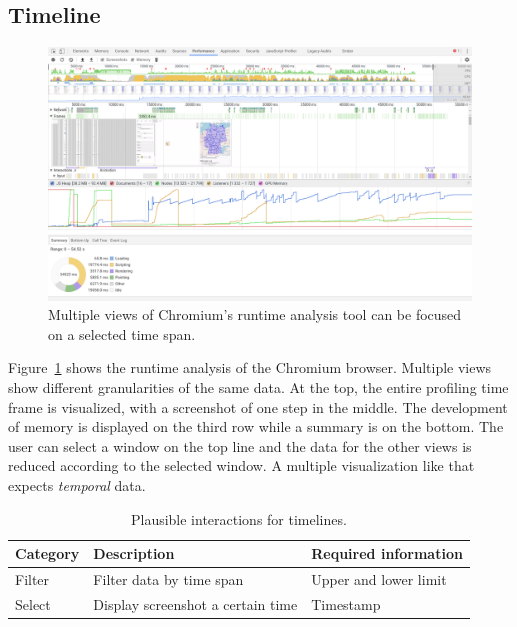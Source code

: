 \subsection{Timeline}

\begin{figure}
  \centering
    \includegraphics[width=\linewidth]{figures/analysis/profiler}
  \caption{Multiple views of Chromium's runtime analysis tool can be focused on a selected time span.}
  \label{fig:analysis:timeline}
\end{figure}
Figure~\ref{fig:analysis:timeline} shows the runtime analysis of the Chromium browser.
Multiple views show different granularities of the same data.
At the top, the entire profiling time frame is visualized, with a screenshot of one step in the middle.
The development of memory is displayed on the third row while a summary is on the bottom.
The user can select a window on the top line and the data for the other views is reduced according to the selected window.
A multiple visualization like that expects \emph{temporal} data.

\begin{table}[H]
  \caption{Plausible interactions for timelines.}%
  \label{fig:analysis:timeline:interactions}
  \begin{tabularx}{\linewidth}{lXX}
    \bf Category & \bf Description & \bf Required information \\
    \hline
    Filter & Filter data by time span & Upper and lower limit \\
    Select & Display screenshot a certain time & Timestamp  \\
  \end{tabularx}
\end{table}


